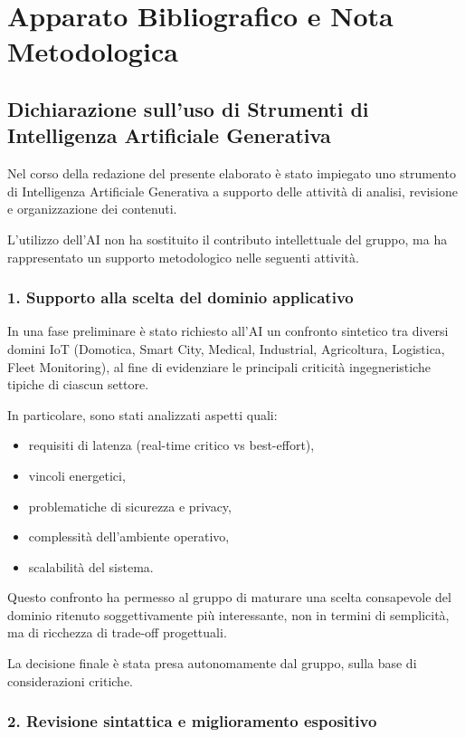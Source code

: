\section{Apparato Bibliografico e Nota Metodologica}

\subsection{Dichiarazione sull'uso di Strumenti di Intelligenza Artificiale Generativa}

Nel corso della redazione del presente elaborato è stato impiegato uno strumento di Intelligenza Artificiale Generativa a supporto delle attività di analisi, revisione e organizzazione dei contenuti.

L'utilizzo dell'AI non ha sostituito il contributo intellettuale del gruppo, ma ha rappresentato un supporto metodologico nelle seguenti attività.

\subsubsection*{1. Supporto alla scelta del dominio applicativo}

In una fase preliminare è stato richiesto all'AI un confronto sintetico tra diversi domini IoT (Domotica, Smart City, Medical, Industrial, Agricoltura, Logistica, Fleet Monitoring), al fine di evidenziare le principali criticità ingegneristiche tipiche di ciascun settore.

In particolare, sono stati analizzati aspetti quali:
\begin{itemize}
    \item requisiti di latenza (real-time critico vs best-effort),
    \item vincoli energetici,
    \item problematiche di sicurezza e privacy,
    \item complessità dell'ambiente operativo,
    \item scalabilità del sistema.
\end{itemize}

Questo confronto ha permesso al gruppo di maturare una scelta consapevole del dominio ritenuto soggettivamente più interessante, non in termini di semplicità, ma di ricchezza di trade-off progettuali.

La decisione finale è stata presa autonomamente dal gruppo, sulla base di considerazioni critiche.

\subsubsection*{2. Revisione sintattica e miglioramento espositivo}


